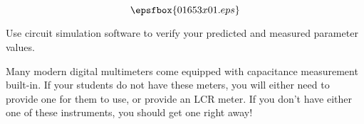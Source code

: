 

$$\epsfbox{01653x01.eps}$$

\vfil \eject






Use circuit simulation software to verify your predicted and measured parameter values.







Many modern digital multimeters come equipped with capacitance measurement built-in.  If your students do not have these meters, you will either need to provide one for them to use, or provide an LCR meter.  If you don't have either one of these instruments, you should get one right away!





